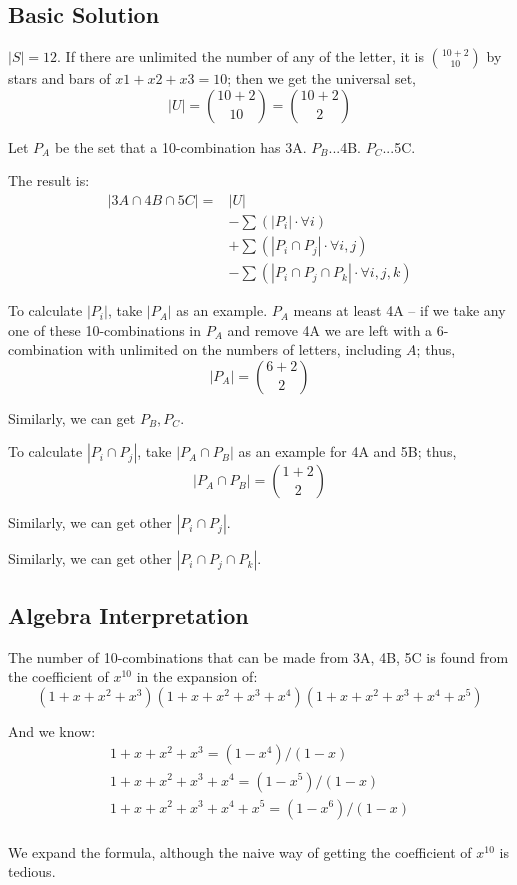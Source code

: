\subsection{Basic Solution}
$|S| = 12$. If there are unlimited the number of any of the letter, it is ${10+2 \choose 10}$ by stars and bars of $x1+x2+x3=10$; then we get the universal set, 
$$
|U|={10+2 \choose 10}={10+2 \choose 2}
$$

Let $P_A$ be the set that a 10-combination has  3A. $P_B$...4B. $P_C$...5C. 

The result is:
\begin{align*}
|3A \cap 4B \cap 5C| = & |U|\\
& - \sum{(|P_i|\cdot \forall i)} \\
& + \sum{(|P_i \cap P_j|\cdot \forall i,j)}\\
& - \sum{(|P_i \cap P_j \cap P_k|\cdot \forall i,j,k)}
\end{align*}

To calculate $|P_i|$, take $|P_A|$ as an example. $P_A$ means at least 4A -- if we take any one of these 10-combinations in $P_A$ and remove 4A we are left with a 6-combination with unlimited on the numbers of letters, including $A$; thus,
$$
|P_A|={6+2 \choose 2}
$$

Similarly, we can get $P_B, P_C$.

To calculate $|P_i \cap P_j|$, take $|P_A \cap P_B|$ as an example for 4A and 5B; thus,
$$
|P_A \cap P_B| = {1+2 \choose 2}
$$

Similarly, we can get other $|P_i \cap P_j|$.

Similarly, we can get other $|P_i \cap P_j \cap P_k|$.
\subsection{Algebra Interpretation}
The number of 10-combinations that can be made from 3A, 4B, 5C is found from the coefficient of $x^{10}$ in the expansion of:
$$
(1+x+x^2+x^3)(1+x+x^2+x^3+x^4)(1+x+x^2+x^3+x^4+x^5)
$$

And we know:
\begin{eqnarray*}
1+x+x^2+x^3         = (1-x^4)/(1-x)  \\
1+x+x^2+x^3+x^4     = (1-x^5)/(1-x)  \\
1+x+x^2+x^3+x^4+x^5 = (1-x^6)/(1-x)  \\
\end{eqnarray*}


We expand the formula, although the  naive way of getting the coefficient of $x^{10}$ is tedious. 

